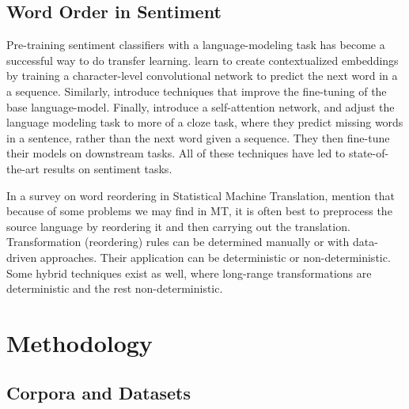 \documentclass[11pt,a4paper]{article}
\begin{document}
\subsection{Word Order in Sentiment}

Pre-training sentiment classifiers with a language-modeling task has
become a successful way to do transfer learning.  learn
to create contextualized embeddings by training a character-level convolutional
network to predict the next word in a a sequence. Similarly,  introduce techniques that improve the fine-tuning of the base language-model. Finally, 
 introduce a self-attention network, and adjust the language
modeling task to more of a cloze task, where they predict missing words in a sentence, rather than the next word given a sequence. They then fine-tune their models on downstream tasks. All of these techniques have led to state-of-the-art results on sentiment tasks.

In a survey on word reordering in Statistical Machine Translation,  mention that because of some problems we may find in MT, it is often best to preprocess the source language by reordering it and then carrying out the translation. Transformation (reordering) rules can be determined manually or with data-driven approaches. Their application can be deterministic or non-deterministic. Some hybrid techniques exist as well, where long-range transformations are deterministic and the rest non-deterministic.

\section{Methodology}

\subsection{Corpora and Datasets}
\end{document}
